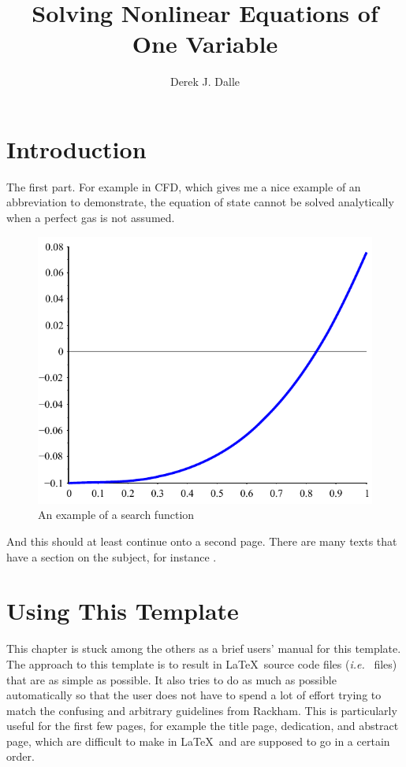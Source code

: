\documentclass[thesis]{./tex/thesis-umich}
\title{Solving Nonlinear Equations of One Variable}
\author{Derek J. Dalle}
\begin{document}
\chapter{Introduction}   \label{chap:intro}
The first part.  For example in \ac{CFD}, which gives me a nice
example of an abbreviation to demonstrate, the equation of state
cannot be solved analytically when a perfect gas is not assumed.

\begin{figure}
 \begin{center}
  \includegraphics[scale=1]{./pics/f1_plain.pdf}
 \end{center}
 \caption{ \label{fig:fn:1}
  An example of a search function}
\end{figure}

\newpage

And this should at least continue onto a second page.  There are many
texts that have a section on the subject, for instance
\cite{chapra:2002:numerics}.

\chapter{Using This Template}
This chapter is stuck among the others as a brief users' manual for this
template.  The approach to this template is to result in \LaTeX~source
code files (\textit{i.e.}~ files) that are as simple as
possible.  It also tries to do as much as possible automatically so that
the user does not have to spend a lot of effort trying to match the
confusing and arbitrary guidelines from Rackham.  This is particularly
useful for the first few pages, for example the title page, dedication,
and abstract page, which are difficult to make in \LaTeX~and are
supposed to go in a certain order.
\end{document}
